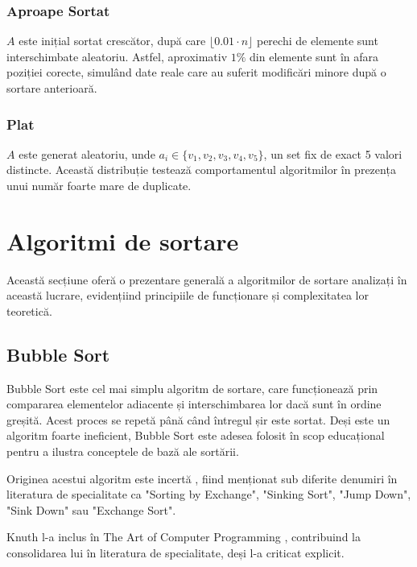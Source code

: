 \documentclass[9pt,a4paper,twocolumn,twoside]{rho-class/rho}
\begin{document}
\subsubsection{Aproape Sortat}
$A$ este inițial sortat crescător, după care $\lfloor 0.01 \cdot n \rfloor$ 
perechi de elemente sunt interschimbate aleatoriu. Astfel, aproximativ $1\%$ 
din elemente sunt în afara poziției corecte, simulând date reale care au 
suferit modificări minore după o sortare anterioară.

\subsubsection{Plat}
$A$ este generat aleatoriu, unde $a_i \in \{v_1, v_2, v_3, v_4, v_5\}$, 
un set fix de exact 5 valori distincte. Această distribuție testează 
comportamentul algoritmilor în prezența unui număr foarte mare de duplicate.
    
    
    \section{Algoritmi de sortare}
    \label{sec:algoritmi}

    Această secțiune oferă o prezentare generală a algoritmilor de sortare analizați în această lucrare, evidențiind principiile de funcționare și complexitatea lor teoretică.

    \subsection{Bubble Sort}
    Bubble Sort este cel mai simplu algoritm de sortare, care funcționează prin compararea elementelor adiacente și interschimbarea lor dacă sunt în ordine greșită. Acest proces se repetă până când întregul șir este sortat.
    Deși este un algoritm foarte ineficient, Bubble Sort este adesea folosit în scop educațional pentru a ilustra conceptele de bază ale sortării.


        \begin{rhoenv}[frametitle=Origine și popularitate]
            Originea acestui algoritm este incertă \cite{astrachan2003bubble}, fiind menționat sub diferite denumiri în literatura de specialitate ca "Sorting by Exchange", "Sinking Sort", "Jump Down", "Sink Down" sau "Exchange Sort".


Knuth l-a inclus în The Art of Computer Programming \cite{knuth1998sorting}, contribuind la consolidarea lui în literatura de specialitate, deși l-a criticat explicit.     \end{rhoenv}
\end{document}
